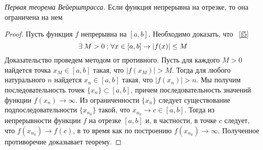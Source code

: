 \begin{theorem} \emph{Первая теорема Вейерштрасса.}
Если функция непрерывна на отрезке, то она ограничена на нем
\end {theorem} 
\begin {proof}
Пусть функция $f$ непрерывна на $[a, b]$. Необходимо доказать, что ~\eqref{f5}
\newline
\begin{equation}
\label{f5}
\centering
\exists \: M>0 : \forall x \in [a, b] \rightarrow |f(x)| \leq M
\end{equation}
\newline
Доказательство проведем методом от противного. Пусть
для каждого $M > 0$ найдется точка $x_M \in [a, b]$ такая, что
$|f(x_M)| > M$. Тогда для любого натурального $n$ найдется
$x_n \in [a, b]$ такая, что $|f(x_n)| > n$. Мы получим последовательность точек $\{x_n\} \subset [a, b]$, причем последовательность
значений функции $f(x_n) \rightarrow \infty$. Из ограниченности $\{x_n\}$
следует существование подпоследовательности $\{x_{n_k}\}$ такой, что $x_{n_k} \rightarrow c \in [a, b]$. Тогда из непрерывности функции
$f$ на отрезке $[a, b]$ и, в частности, в точке $c$ следует, что
$f(x_{n_k}) \rightarrow f(c)$, в то время как по построению $f(x_{n_k}) \rightarrow \infty$.
Полученное противоречие доказывает теорему.
\end{proof}


